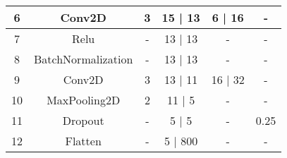 \documentclass[11pt]{article}
\begin{document}
\begin{table}[H]
\begin{tabular}{|c|c|c|c|c|c|}
6         & Conv2D             & 3                                                                 & 15 | 13                                                            & 6 | 16                                                                          & -                                                                     \\ \hline
7         & Relu               & -                                                                 & 13 | 13                                                            & -                                                                               & -                                                                     \\ \hline
8         & BatchNormalization & -                                                                 & 13 | 13                                                            & -                                                                               & -                                                                     \\ \hline
9         & Conv2D             & 3                                                                 & 13 | 11                                                            & 16 | 32                                                                         & -                                                                     \\ \hline
10        & MaxPooling2D       & 2                                                                 & 11 | 5                                                             & -                                                                               & -                                                                     \\ \hline
11        & Dropout            & -                                                                 & 5 | 5                                                              & -                                                                               & 0.25                                                                  \\ \hline
12        & Flatten            & -                                                                 & 5 | 800                                                            & -                                                                               & -                                                                     \\ \hline

\end{tabular}
\end{table}
\end{document}
